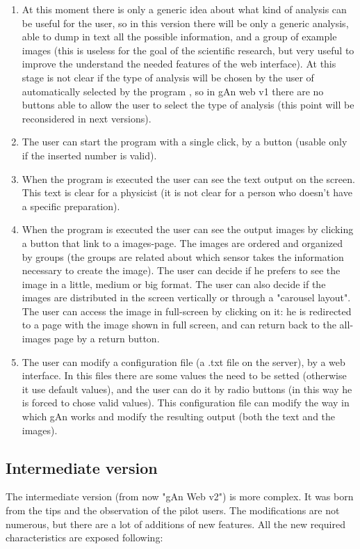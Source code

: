 \begin{enumerate}
\begin{enumerate}
\item At this moment there is only a generic idea about what kind of analysis can be useful for the user, so in this version there will be only a generic analysis, able to dump in text all the possible information, and a group of example images (this is useless for the goal of the scientific research, but very useful to improve the understand the needed features of the web interface).
At this stage is not clear if the type of analysis will be chosen by the user of automatically selected by the program , so in gAn web v1 there are no buttons able to allow the user to select the type of analysis (this point will be reconsidered in next versions).

\item The user can start the program with a single click, by a button (usable only if the inserted number is valid).

\item When the program is executed the user can see the text output on the screen. This text is clear for a physicist (it is not clear for a person who doesn't have a specific preparation). 

\item When the program is executed the user can see the output images by clicking a button that link to a images-page. The images are ordered and organized by groups (the groups are related about which sensor takes the information necessary to create the image). The user can decide if he prefers to see the image in a little, medium or big format. The user can also decide if the images are distributed in the screen vertically or through a "carousel layout". The user can access the image in full-screen by clicking on it: he is redirected to a page with the image shown in full screen, and can return back to the all-images page by a return button. 

\item The user can modify a configuration file (a .txt file on the server), by a web interface. In this files there are some values the need to be setted (otherwise it use default values), and the user can do it by radio buttons (in this way he is forced to chose valid values). This configuration file can modify the way in which gAn works and modify the resulting output (both the text and the images).   

\end{enumerate}

\subsection{Intermediate version}
The intermediate version (from now "gAn Web v2") is more complex. It was born from the tips and the observation of the pilot users. The modifications are not numerous, but there are a lot of additions of new features. All the new required characteristics are exposed following:


\end{enumerate}
